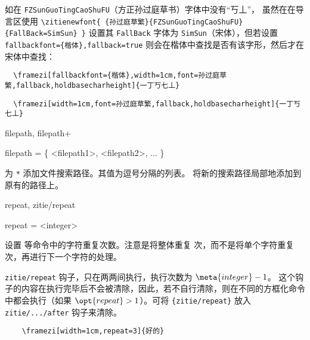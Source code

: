 \documentclass{ctxdoc}
\begin{document}
如在 \verb|FZSunGuoTingCaoShuFU|（方正孙过庭草书）字体中没有“丂丄”，
虽然在在导言区使用 \verb|\zitienewfont{ {孙过庭草繁}{FZSunGuoTingCaoShuFU}{FallBack=SimSun} }| 设置其 \verb|FallBack| 字体为 \verb|SimSun|（宋体），但若设置 \verb|fallbackfont={楷体},fallback=true| 则会在楷体中查找是否有该字形，然后才在宋体中查找：

\begin{verbatim}
  \framezi[fallbackfont={楷体},width=1cm,font=孙过庭草繁,fallback,holdbasecharheight]{一丁丂七丄}
\end{verbatim}

\begin{verbatim}
  \framezi[width=1cm,font=孙过庭草繁,fallback,holdbasecharheight]{一丁丂七丄}
\end{verbatim}

\begin{function}{
  filepath,
  filepath+
}
  \begin{syntax}
    filepath = \{ <filepath1>, <filepath2>, ... \}
  \end{syntax}
   为 \verb|*| 添加文件搜索路径。其值为逗号分隔的列表。
   将新的搜索路径局部地添加到原有的路径上。
\end{function}

\begin{function}{
  repeat,
  zitie/repeat
}
  \begin{syntax}
    repeat = <integer> 
  \end{syntax}
  设置  等命令中的字符重复次数。注意是将整体重复  次，而不是将单个字符重复  次，再进行下一个字符的处理。

  \verb|zitie/repeat| 钩子，只在两两间执行，执行次数为 $\meta{integer}-1$。
  这个钩子的内容在执行完毕后不会被清除，因此，若不自行清除，则在不同的方框化命令中都会执行（如果 $\opt{repeat}>1$）。可将 \verb|{zitie/repeat}| 放入 \verb|zitie/.../after| 钩子来清除。

  \begin{verbatim}
    \framezi[width=1cm,repeat=3]{好的}
  \end{verbatim}
\end{function}
\end{document}
